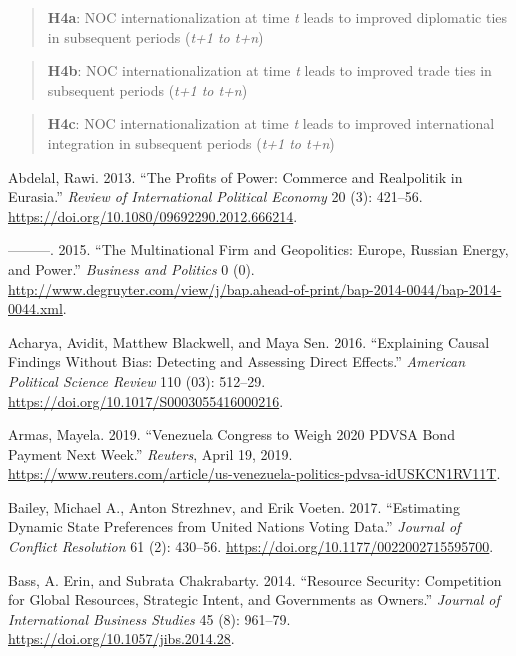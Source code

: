 \documentclass[11pt,]{book}
\begin{document}
\begin{quote}
\textbf{H4a}: NOC internationalization at time \emph{t} leads to improved diplomatic ties in subsequent periods (\emph{t+1 to t+n})
\end{quote}

\begin{quote}
\textbf{H4b}: NOC internationalization at time \emph{t} leads to improved trade ties in subsequent periods (\emph{t+1 to t+n})
\end{quote}

\begin{quote}
\textbf{H4c}: NOC internationalization at time \emph{t} leads to improved international integration in subsequent periods (\emph{t+1 to t+n})
\end{quote}

\hypertarget{refs}{}
\leavevmode\hypertarget{ref-abdelal_profits_2013}{}%
Abdelal, Rawi. 2013. ``The Profits of Power: Commerce and Realpolitik in Eurasia.'' \emph{Review of International Political Economy} 20 (3): 421--56. \url{https://doi.org/10.1080/09692290.2012.666214}.

\leavevmode\hypertarget{ref-abdelal_multinational_2015}{}%
---------. 2015. ``The Multinational Firm and Geopolitics: Europe, Russian Energy, and Power.'' \emph{Business and Politics} 0 (0). \url{http://www.degruyter.com/view/j/bap.ahead-of-print/bap-2014-0044/bap-2014-0044.xml}.

\leavevmode\hypertarget{ref-acharya_explaining_2016}{}%
Acharya, Avidit, Matthew Blackwell, and Maya Sen. 2016. ``Explaining Causal Findings Without Bias: Detecting and Assessing Direct Effects.'' \emph{American Political Science Review} 110 (03): 512--29. \url{https://doi.org/10.1017/S0003055416000216}.

\leavevmode\hypertarget{ref-armas_venezuela_2019}{}%
Armas, Mayela. 2019. ``Venezuela Congress to Weigh 2020 PDVSA Bond Payment Next Week.'' \emph{Reuters}, April 19, 2019. \url{https://www.reuters.com/article/us-venezuela-politics-pdvsa-idUSKCN1RV11T}.

\leavevmode\hypertarget{ref-bailey_estimating_2017}{}%
Bailey, Michael A., Anton Strezhnev, and Erik Voeten. 2017. ``Estimating Dynamic State Preferences from United Nations Voting Data.'' \emph{Journal of Conflict Resolution} 61 (2): 430--56. \url{https://doi.org/10.1177/0022002715595700}.

\leavevmode\hypertarget{ref-bass_resource_2014}{}%
Bass, A. Erin, and Subrata Chakrabarty. 2014. ``Resource Security: Competition for Global Resources, Strategic Intent, and Governments as Owners.'' \emph{Journal of International Business Studies} 45 (8): 961--79. \url{https://doi.org/10.1057/jibs.2014.28}.
\end{document}
